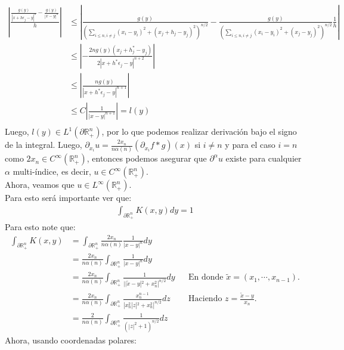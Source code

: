 \begin{homeworkProblem}
\begin{enumerate}
\begin{solucion}
      \begin{align*}
        \left| \frac{\frac{g(y)}{|x+h\epsilon_j-y|^n}-\frac{g(y)}{|x-y|^n}}{h} \right|&\leq \left| \frac{g(y)}{\left(\sum_{i\leq n, i\neq j}(x_i-y_i)^2+(x_j+h_j-y_j)^2\right)^{n/2}}-\frac{g(y)}{\left(\sum_{i\leq n, i\neq j}(x_i-y_i)^2+(x_j-y_j)^2\right)^{n/2}} \frac{1}{h}\right|\\
        &\leq \left| -\frac{2ng(y)(x_j+h^*_j-y_j)}{2|x+h^*\epsilon_j-y|^{n+2}} \right|\\
        &\leq \left| \frac{ng(y)}{|x+h^*\epsilon_j-y|^{n+1}} \right|\\
        &\leq C\left| \frac{1}{|x-y|^{n+1}} \right|=l(y)\\
      \end{align*}
      Luego, $l(y)\in L^{1}(\partial\mathbb{R}^{n}_{+})$, por lo que podemos realizar derivación bajo el signo de la integral.
      Luego, $\partial_{x_i} u = \frac{2x_n}{n\alpha(n)}(\partial_{x_i}f*g)(x)$ si $i\neq n$ y para el caso $i=n$ como $2x_n\in C^{\infty}(\mathbb{R}^{n}_{+})$, entonces podemos asegurar que $\partial^{\alpha}u$ existe para cualquier $\alpha$ multi-índice, es decir, $u\in C^{\infty}(\mathbb{R}^{n}_{+})$.\\
      Ahora, veamos que $u\in L^{\infty}(\mathbb{R}^{n}_{+})$.\\
      Para esto será importante ver que:
      \begin{align*}
        \int_{\partial \mathbb{R}^{n}_{+}}K(x,y)dy=1
      \end{align*}
      Para esto note que:
      \begin{align*}
        \int_{\partial \mathbb{R}^{n}_+}K(x,y)&=\int_{\partial \mathbb{R}^{n}_+}\frac{2x_n}{n\alpha(n)}\frac{1}{|x-y|^n}dy\\
        &=\frac{2x_n}{n\alpha(n)}\int_{\partial \mathbb{R}^{n}_{+}}\frac{1}{|x-y|^n}dy\\
        &=\frac{2x_n}{n\alpha(n)}\int_{\partial \mathbb{R}^{n}_{+}}\frac{1}{||\tilde{x}-y|^2+x_n^2|^{n/2}}dy &&\text{En donde $\tilde{x}=(x_1,\cdots,x_{n-1})$.}\\
        &=\frac{2x_n}{n\alpha(n)}\int_{\partial \mathbb{R}^{n}_{+}}\frac{x_n^{n-1}}{|x_n^2|z|^2+x_n^2|^{n/2}}dz &&\text{Haciendo $z=\frac{\tilde{x}-y}{x_n}$.}\\
        &=\frac{2}{n\alpha(n)}\int_{\partial \mathbb{R}^{n}_{+}}\frac{1}{(|z|^2+1)^{n/2}}dz
      \end{align*}
      Ahora, usando coordenadas polares:
      \begin{align*}

\end{align*}
\end{solucion}
\end{enumerate}
\end{homeworkProblem}
